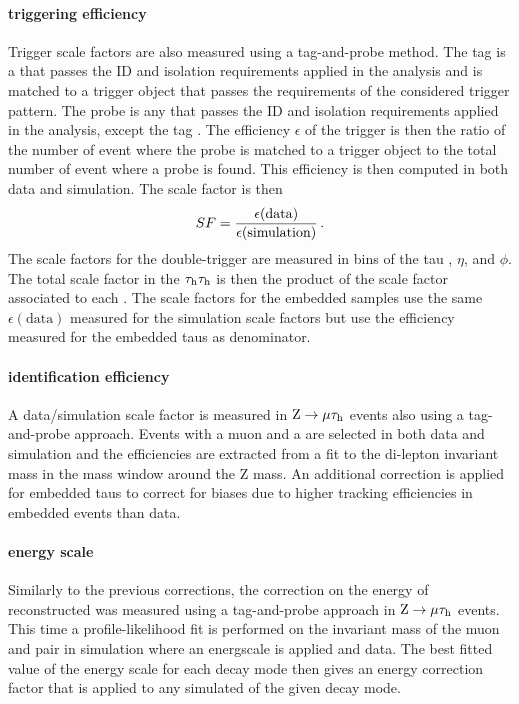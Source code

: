 \paragraph{\tauh triggering efficiency} Trigger scale factors are also measured using a tag-and-probe method. The tag is a \tauh that passes the ID and isolation requirements applied in the analysis and is matched to a trigger \tauh object that passes the requirements of the considered trigger pattern. The probe is any \tauh that passes the ID and isolation requirements applied in the analysis, except the tag \tauh. The efficiency $\epsilon$ of the trigger is then the ratio of the number of event where the probe is matched to a \tauh trigger object to the total number of event where a probe is found. This efficiency is then computed in both data and simulation. The scale factor is then
\begin{equation}
    SF = \frac{\epsilon(\mathrm{data})}{\epsilon(\mathrm{simulation})} \mend
\end{equation}
The scale factors for the double-\tauh trigger are measured in bins of the tau \pt, $\eta$, and $\phi$. The total scale factor in the $\tau_{\rm h}\tau_{\rm h}$ is then the product of the scale factor associated to each \tauh. The scale factors for the embedded samples use the same $\epsilon(\mathrm{data})$ measured for the simulation scale factors but use the efficiency measured for the embedded taus as denominator.

\paragraph{\tauh identification efficiency} A data/simulation scale factor is measured in $\mathrm{Z}\rightarrow\mu\tau_{\rm h}$ events also using a tag-and-probe approach. Events with a muon and a \tauh are selected in both data and simulation and the efficiencies are extracted from a fit to the di-lepton invariant mass in the mass window around the $\mathrm{Z}$ mass. An additional correction is applied for embedded taus to correct for biases due to higher tracking efficiencies in embedded events than data.

\paragraph{\tauh energy scale} Similarly to the previous corrections, the correction on the energy of reconstructed \tauh was measured using a tag-and-probe approach in $\mathrm{Z}\rightarrow\mu\tau_{\rm h}$ events. This time a profile-likelihood fit is performed on the invariant mass of the muon and \tauh pair in simulation where an energscale is applied and data. The best fitted value of the energy scale for each decay mode then gives an energy correction factor that is applied to any simulated \tauh of the given decay mode.


